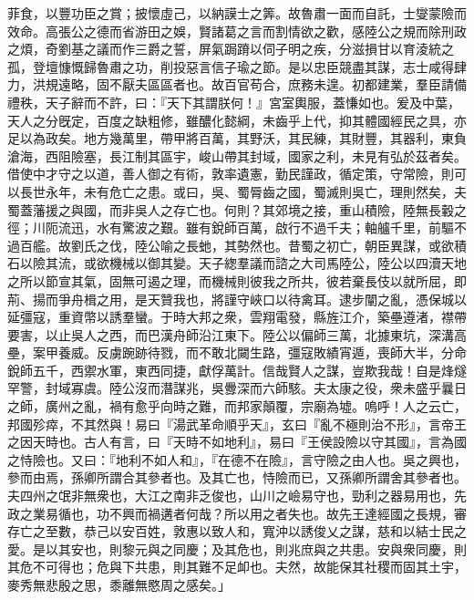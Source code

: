 \begin{pinyinscope}
菲食，以豐功臣之賞；披懷虛己，以納謨士之筭。故魯肅一面而自託，士燮蒙險而效命。高張公之德而省游田之娛，賢諸葛之言而割情欲之歡，感陸公之規而除刑政之煩，奇劉基之議而作三爵之誓，屏氣跼蹐以伺子明之疾，分滋損甘以育淩統之孤，登壇慷慨歸魯肅之功，削投惡言信子瑜之節。是以忠臣競盡其謀，志士咸得肆力，洪規遠略，固不厭夫區區者也。故百官苟合，庶務未遑。初都建業，羣臣請備禮秩，天子辭而不許，曰：『天下其謂朕何！』宮室輿服，蓋慊如也。爰及中葉，天人之分旣定，百度之缺粗修，雖醲化懿綱，未齒乎上代，抑其體國經民之具，亦足以為政矣。地方幾萬里，帶甲將百萬，其野沃，其民練，其財豐，其器利，東負滄海，西阻險塞，長江制其區宇，峻山帶其封域，國家之利，未見有弘於茲者矣。借使中才守之以道，善人御之有術，敦率遺憲，勤民謹政，循定策，守常險，則可以長世永年，未有危亡之患。或曰，吳、蜀脣齒之國，蜀滅則吳亡，理則然矣，夫蜀蓋藩援之與國，而非吳人之存亡也。何則？其郊境之接，重山積險，陸無長轂之徑；川阨流迅，水有驚波之艱。雖有銳師百萬，啟行不過千夫；軸艫千里，前驅不過百艦。故劉氏之伐，陸公喻之長虵，其勢然也。昔蜀之初亡，朝臣異謀，或欲積石以險其流，或欲機械以御其變。天子緫羣議而諮之大司馬陸公，陸公以四瀆天地之所以節宣其氣，固無可遏之理，而機械則彼我之所共，彼若棄長伎以就所屈，即荊、揚而爭舟楫之用，是天贊我也，將謹守峽口以待禽耳。逮步闡之亂，憑保城以延彊寇，重資幣以誘羣蠻。于時大邦之衆，雲翔電發，縣旌江介，築壘遵渚，襟帶要害，以止吳人之西，而巴漢舟師沿江東下。陸公以偏師三萬，北據東坑，深溝高壘，案甲養威。反虜踠跡待戮，而不敢北闚生路，彊寇敗績宵遁，喪師大半，分命銳師五千，西禦水軍，東西同捷，獻俘萬計。信哉賢人之謀，豈欺我哉！自是烽燧罕警，封域寡虞。陸公沒而潛謀兆，吳釁深而六師駭。夫太康之役，衆未盛乎曩日之師，廣州之亂，禍有愈乎向時之難，而邦家顛覆，宗廟為墟。嗚呼！人之云亡，邦國殄瘁，不其然與！易曰『湯武革命順乎天』，玄曰『亂不極則治不形』，言帝王之因天時也。古人有言，曰『天時不如地利』，易曰『王侯設險以守其國』，言為國之恃險也。又曰：『地利不如人和』，『在德不在險』，言守險之由人也。吳之興也，參而由焉，孫卿所謂合其參者也。及其亡也，恃險而已，又孫卿所謂舍其參者也。夫四州之氓非無衆也，大江之南非乏俊也，山川之嶮易守也，勁利之器易用也，先政之業易循也，功不興而禍遘者何哉？所以用之者失也。故先王達經國之長規，審存亡之至數，恭己以安百姓，敦惠以致人和，寬沖以誘俊乂之謀，慈和以結士民之愛。是以其安也，則黎元與之同慶；及其危也，則兆庶與之共患。安與衆同慶，則其危不可得也；危與下共患，則其難不足卹也。夫然，故能保其社稷而固其土宇，麥秀無悲殷之思，黍離無愍周之感矣。」


\end{pinyinscope}
